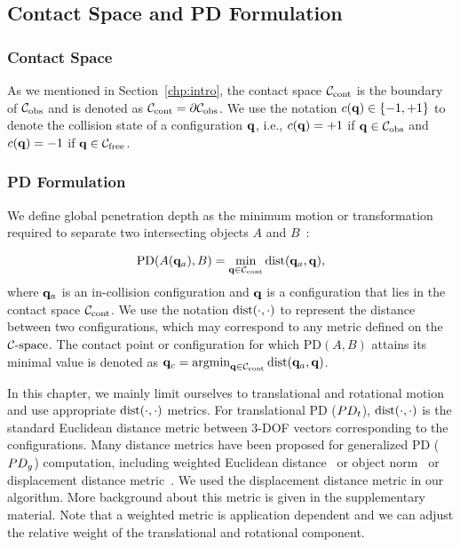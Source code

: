 \subsection{Contact Space and PD Formulation}
\subsubsection{Contact Space}
As we mentioned in Section~\ref{chp:intro}, the contact space $\mathcal C_\text{cont}$ is the boundary of $\mathcal C_{\text{obs}}$ and is denoted as $\mathcal C_\text{cont} =\partial \mathcal C_{\text{obs}}$. We use the notation $c(\mathbf q) \in \{-1,+1\}$ to denote the collision state of a configuration $\mathbf q$, i.e., $c(\mathbf q)=+1$ if $\mathbf q \in \mathcal C_{\text{obs}}$ and $c(\mathbf q)=-1$ if $\mathbf q \in \mathcal C_{\text{free}}$.

\subsubsection{PD Formulation}
We define global penetration depth as the minimum motion or transformation required to separate two intersecting objects $A$ and $B$~\cite{Agarwal:2000:CPD,Kim:2002:DEEP}:

\begin{align}
\label{eq:2:PDgdef} \text{PD}(A(\mathbf q_a), B) = \min_{\mathbf q \in
\mathcal C_\text{cont}} \operatorname{dist}(\mathbf q_a, \mathbf q),
\end{align}
where $\mathbf q_a$ is an in-collision configuration and $\mathbf q$ is a
configuration that lies in the contact space $\mathcal C_\text{cont}$.
We use the notation $\operatorname{dist}(\cdot, \cdot)$ to represent the distance between two configurations,
which may correspond to any metric defined on the $\mathcal C\text{-space}$. The
contact point or configuration for which PD$(A, B)$ attains its
minimal value is denoted as $\mathbf q_c = \operatorname{argmin}_{\mathbf q
\in \mathcal C_\text{cont}} \operatorname{dist}(\mathbf q_a, \mathbf q)$.

In this chapter, we mainly limit ourselves to translational and rotational motion and
use appropriate $\operatorname{dist}(\cdot,\cdot)$ metrics.
For translational PD ($PD_t$), $\operatorname{dist}(\cdot, \cdot)$ is the standard Euclidean distance metric between 3-DOF vectors corresponding to the configurations. Many distance metrics have been proposed for generalized PD ($PD_g$) computation, including weighted Euclidean
distance~\cite{Wang:CBO:2012} or object norm~\cite{Je:2012:PRP} or displacement distance metric~\cite{Zhang:2007:AFP}. We used the displacement distance metric in our algorithm. More background about this metric is given in the supplementary material. Note that a weighted metric is application dependent and we can adjust the relative weight of the translational and rotational component.


